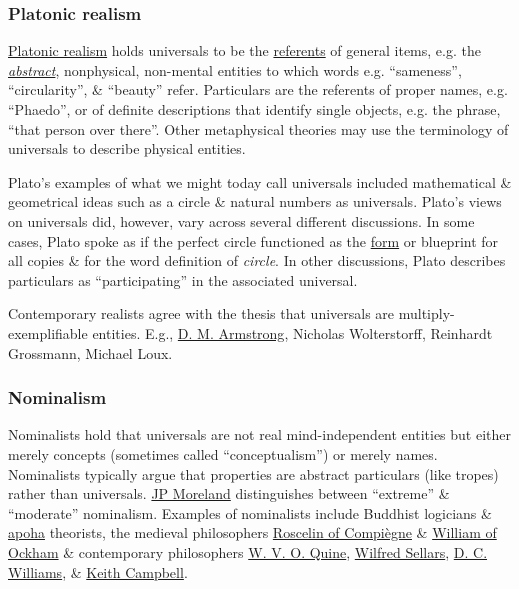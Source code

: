\documentclass{article}
\begin{document}
\subsubsection{Platonic realism}
\href{https://en.wikipedia.org/wiki/Platonic_realism}{Platonic realism} holds universals to be the \href{https://en.wikipedia.org/wiki/Referent}{referents} of general items, e.g. the \href{https://en.wikipedia.org/wiki/Abstraction}{\it abstract}, nonphysical, non-mental entities to which words e.g. ``sameness'', ``circularity'', \& ``beauty'' refer. Particulars are the referents of proper names, e.g. ``Phaedo'', or of definite descriptions that identify single objects, e.g. the phrase, ``that person over there''. Other metaphysical theories may use the terminology of universals to describe physical entities.

Plato's examples of what we might today call universals included mathematical \& geometrical ideas such as a circle \& natural numbers as universals. Plato's views on universals did, however, vary across several different discussions. In some cases, {\sc Plato} spoke as if the perfect circle functioned as the \href{https://en.wikipedia.org/wiki/Substantial_form}{form} or blueprint for all copies \& for the word definition of {\it circle}. In other discussions, {\sc Plato} describes particulars as ``participating'' in the associated universal.

Contemporary realists agree with the thesis that universals are multiply-exemplifiable entities. E.g., \href{https://en.wikipedia.org/wiki/D._M._Armstrong}{\sc D. M. Armstrong}, {\sc Nicholas Wolterstorff, Reinhardt Grossmann, Michael Loux}.

\subsubsection{Nominalism}
Nominalists hold that universals are not real mind-independent entities but either merely concepts (sometimes called ``conceptualism'') or merely names. Nominalists typically argue that properties are abstract particulars (like tropes) rather than universals. \href{https://en.wikipedia.org/wiki/JP_Moreland}{\sc JP Moreland} distinguishes between ``extreme'' \& ``moderate'' nominalism. Examples of nominalists include Buddhist logicians \& \href{https://en.wikipedia.org/wiki/Apoha}{apoha} theorists, the medieval philosophers \href{https://en.wikipedia.org/wiki/Roscelin_of_Compi%C3%A8gne}{\sc Roscelin of Compi\`egne} \& \href{https://en.wikipedia.org/wiki/William_of_Ockham}{William of Ockham} \& contemporary philosophers \href{https://en.wikipedia.org/wiki/W._V._O._Quine}{\sc W. V. O. Quine}, \href{https://en.wikipedia.org/wiki/Wilfred_Sellars}{\sc Wilfred Sellars}, \href{https://en.wikipedia.org/wiki/D._C._Williams}{D. C. Williams}, \& \href{https://en.wikipedia.org/wiki/Keith_Campbell_(philosopher)}{Keith Campbell}.
\end{document}
